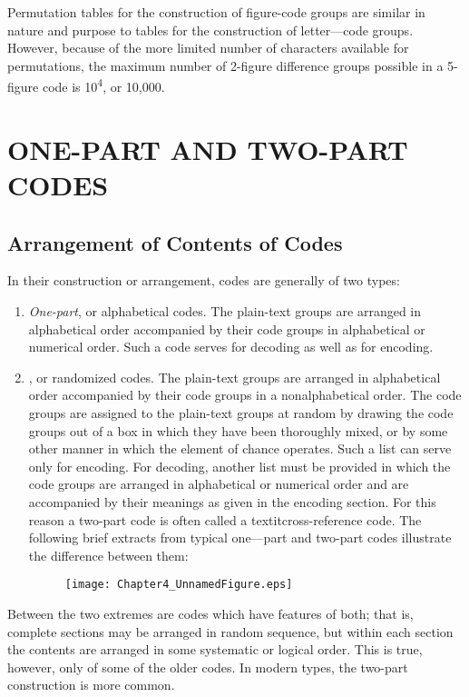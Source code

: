 \mypara Permutation tables for the construction of ﬁgure-code groups are
similar in nature and purpose to tables for the construction of letter—code
groups. However, because of the more limited number of characters
available for permutations, the maximum number of 2-ﬁgure difference
groups possible in a 5-ﬁgure code is 10\textsuperscript{4}, or 10,000.

\section{ONE-PART AND TWO-PART CODES}

\subsection{Arrangement of Contents of Codes}
\mypara In their construction or arrangement, codes are generally of two
types:
\begin{enumerate}
        \item \textit{One-part}, or alphabetical codes. The plain-text groups are
arranged in alphabetical order accompanied by their code groups
in alphabetical or numerical order. Such a code serves for
decoding as well as for encoding.

\item  {}, or randomized codes. The plain-text groups are
arranged in alphabetical order accompanied by their code groups
in a nonalphabetical order. The code groups are assigned to
the plain-text groups at random by drawing the code groups out
of a box in which they have been thoroughly mixed, or by
some other manner in which the element of chance operates.
Such a list can serve only for encoding. For decoding, another
list must be provided in which the code groups are arranged
in alphabetical or numerical order and are accompanied by their
meanings as given in the encoding section. For this reason a
                two-part code is often called a textit{cross-reference code}. The following brief extracts from typical one—part and two-part codes
illustrate the difference between them:

                \begin{figure}[h]
                        \centering
                        \texttt{[image: Chapter4\_UnnamedFigure.eps]}
                \end{figure}
 

\end{enumerate}
\mypara Between the two extremes are codes which have features of both;
that is, complete sections may be arranged in random sequence, but
within each section the contents are arranged in some systematic or
logical order. This is true, however, only of some of the older codes. In
modern types, the two-part construction is more common.


